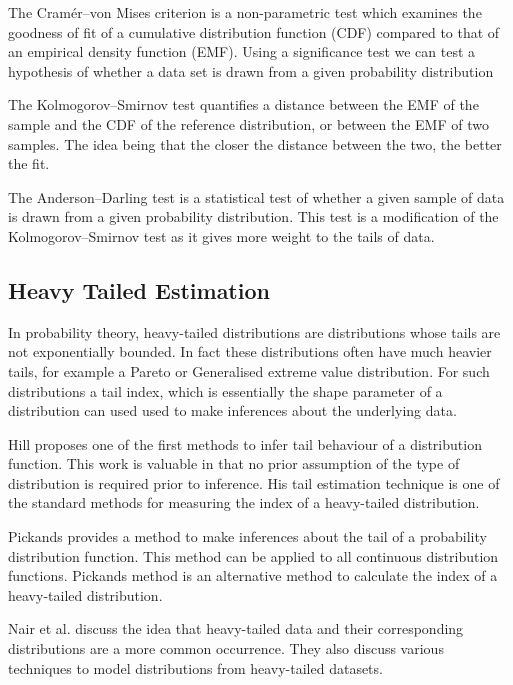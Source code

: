 \documentclass[conference]{IEEEtran}
\begin{document}
The Cram\'er--von Mises criterion \cite{cramer1928composition}\cite{von1928statistik} is a non-parametric test which examines the goodness of fit of a cumulative distribution function (CDF) compared to that of an empirical density function (EMF). Using a significance test we can test a hypothesis of whether a data set is drawn from a given probability distribution

The Kolmogorov--Smirnov \cite{smirnov1948table} test quantifies a distance between the EMF of the sample and the CDF of the reference distribution, or between the EMF of two samples. The idea being that the closer the distance between the two, the better the fit. 

The Anderson--Darling \cite{anderson1954test}\cite{anderson1952asymptotic} test is a statistical test of whether a given sample of data is drawn from a given probability distribution. This test is a modification of the Kolmogorov--Smirnov test as it gives more weight to the tails of data. 

\subsection{Heavy Tailed Estimation}

In probability theory, heavy-tailed distributions are distributions whose tails are not exponentially bounded. In fact these distributions often have much heavier tails, for example a Pareto or Generalised extreme value distribution. For such distributions a tail index, which is essentially the shape parameter of a distribution can used used to make inferences about the underlying data. 

Hill\cite{hill1975simple} proposes one of the first methods to infer tail behaviour of a distribution function. This work is valuable in that no prior assumption of the type of distribution is required prior to inference. His tail estimation technique is one of the standard methods for measuring the index of a heavy-tailed distribution.

Pickands\cite{pickands1975statistical} provides a method to make inferences about the tail of a probability distribution function. This method can be applied to all continuous distribution functions. Pickands method is an alternative method to calculate the index of a heavy-tailed distribution.

Nair et al.\cite{nair2013fundamentals} discuss the idea that heavy-tailed data and their corresponding distributions are a more common occurrence. They also discuss various techniques to model distributions from heavy-tailed datasets.
\end{document}
